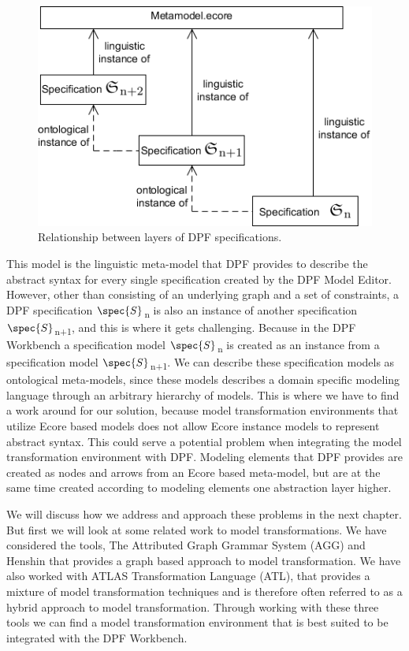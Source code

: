 \begin{figure}[H]
	\centering
	\includegraphics[scale=0.7]{./Figures/metamodelSpecification_1.png}
	\caption[Specification relationship with core meta-model]
	{Relationship between layers of DPF specifications.}
	\label{fig:core_metamodel}
\end{figure}

This model is the linguistic meta-model that DPF provides to describe the
abstract syntax for every single specification created by the DPF Model Editor.
However, other than consisting of an underlying graph and a set of constraints,
a DPF specification $\spec{S}$\textsubscript{n} is also an instance of another
specification$\spec{S}$\textsubscript{n+1}, and this is where it gets
challenging. Because in the DPF Workbench a specification model
$\spec{S}$\textsubscript{n} is created as an instance from a specification model
$\spec{S}$\textsubscript{n+1}. We can describe these specification models as
ontological meta-models, since these models describes a domain specific modeling
language through an arbitrary hierarchy of models. This is where we have to find
a work around for our solution, because model transformation environments that
utilize Ecore based models does not allow Ecore instance models to represent
abstract syntax. This could serve a potential problem when integrating the model
transformation environment with DPF. Modeling elements that DPF provides are
created as nodes and arrows from an Ecore based meta-model, but are at the same
time created according to modeling elements one abstraction layer higher.

We will discuss how we address and approach these problems in the next
chapter. But first we will look at some related work to model transformations.
We have considered the tools, The Attributed Graph Grammar
System\cite{Taentzer2004} (AGG) and Henshin\cite{Henshin_2010} that provides a
graph based approach to model transformation. We have also worked with ATLAS
Transformation Language\cite{ATL_USERMAN} (ATL), that provides a mixture of
model transformation techniques and is therefore often referred to as a hybrid
approach to model transformation. Through working with these three tools we can
find a model transformation environment that is best suited to be integrated
with the DPF Workbench.

